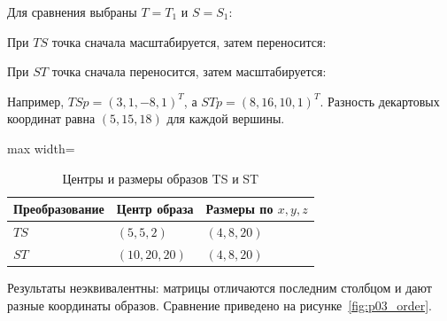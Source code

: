 \documentclass[a4paper,14pt]{extarticle}
\begin{document}
Для сравнения выбраны $T=T_1$ и $S=S_1$:

\begin{center}\end{center}

При $TS$ точка сначала масштабируется, затем переносится:

\begin{center}\end{center}

При $ST$ точка сначала переносится, затем масштабируется:

\begin{center}\end{center}

Например, $TSp=(3,1,-8,1)^T$, а $STp=(8,16,10,1)^T$.
Разность декартовых координат равна $(5,15,18)$ для каждой вершины.

\begin{table}[H]\centering\singlespacing\small
\caption{Центры и размеры образов TS и ST}
\label{tab:transform_order}
\begin{adjustbox}{max width=\linewidth}
\begin{tabular}{lll}
\toprule
Преобразование & Центр образа & Размеры по $x,y,z$ \\
\midrule
$TS$ & $(5,5,2)$ & $(4,8,20)$ \\
$ST$ & $(10,20,20)$ & $(4,8,20)$ \\
\bottomrule\end{tabular}\end{adjustbox}\end{table}

Результаты неэквивалентны: матрицы отличаются последним столбцом и дают
разные координаты образов. Сравнение приведено на рисунке~\ref{fig:p03_order}.
\end{document}
